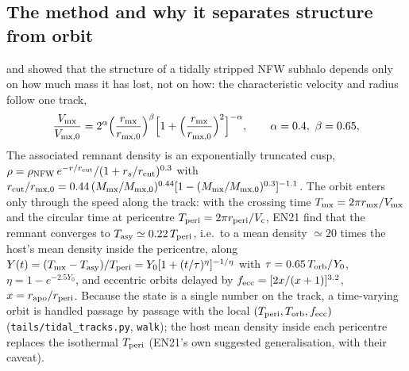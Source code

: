 \documentclass[11pt,a4paper]{article}
\begin{document}
\subsection{The method and why it separates structure from orbit}
\citet{penarrubia2010} and \citet[EN21]{errani2021} showed that the structure of a
tidally stripped NFW subhalo depends only on how much mass it has lost, not on how: the
characteristic velocity and radius follow one track,
\begin{equation}
\frac{V_{\rm mx}}{V_{\rm mx,0}}=2^{\alpha}\Big(\frac{r_{\rm mx}}{r_{\rm mx,0}}\Big)^{\beta}
\Big[1+\Big(\frac{r_{\rm mx}}{r_{\rm mx,0}}\Big)^{2}\Big]^{-\alpha},\qquad \alpha=0.4,\ \beta=0.65,
\end{equation}
The associated remnant density is an exponentially truncated cusp,
$\rho=\rho_{\rm NFW}\,e^{-r/r_{\rm cut}}/(1+r_s/r_{\rm cut})^{0.3}$ with
$r_{\rm cut}/r_{\rm mx,0}=0.44\,(M_{\rm mx}/M_{\rm mx,0})^{0.44}[1-(M_{\rm mx}/M_{\rm mx,0})^{0.3}]^{-1.1}$.
The orbit enters only through the speed along the track: with the crossing time
$T_{\rm mx}=2\pi r_{\rm mx}/V_{\rm mx}$ and the circular time at pericentre
$T_{\rm peri}=2\pi r_{\rm peri}/V_{\rm c}$, EN21 find that the remnant converges to
$T_{\rm asy}\simeq0.22\,T_{\rm peri}$, i.e.\ to a mean density $\simeq20$ times the host's
mean density inside the pericentre, along $Y(t)=(T_{\rm mx}-T_{\rm asy})/T_{\rm peri}=
Y_0[1+(t/\tau)^\eta]^{-1/\eta}$ with $\tau=0.65\,T_{\rm orb}/Y_0$, $\eta=1-e^{-2.5Y_0}$, and
eccentric orbits delayed by $f_{\rm ecc}=[2x/(x+1)]^{3.2}$, $x=r_{\rm apo}/r_{\rm peri}$.
Because the state is a single number on the track, a time-varying orbit is handled passage by
passage with the local $(T_{\rm peri},T_{\rm orb},f_{\rm ecc})$ (\texttt{tails/tidal\_tracks.py},
\texttt{walk}); the host mean density inside each pericentre replaces the isothermal
$T_{\rm peri}$ (EN21's own suggested generalisation, with their caveat).
\end{document}
